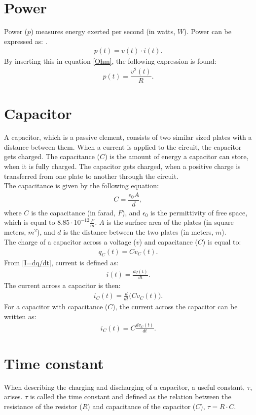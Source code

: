 \section{Power} 
Power ($p$) measures energy exerted per second (in watts, $W$). Power can be expressed as: \cite[p. 22]{bcircuit5}.
\begin{align} 
\label{power}
p(t)=v(t)\cdot i(t).
\end{align}
By inserting this in equation \eqref{Ohm}, the following expression is found:
\begin{align}
p(t)=\dfrac{v^2(t)}{R}. \label{resistor:power}
\end{align}

\section{Capacitor}
A capacitor, which is a passive element, consists of two similar sized plates with a distance between them. When a current is applied to the circuit, the capacitor gets charged. The capacitance ($C$) is the amount of energy a capacitor can store, when it is fully charged. The capacitor gets charged, when a positive charge is transferred from one plate to another through the circuit.
\\
The capacitance is given by the following equation:
\begin{align*}
C=\dfrac{\epsilon_{0}A}{d},
\end{align*}
where $C$ is the capacitance (in farad, $F$), and $\epsilon_{0}$ is the permittivity of free space, which is equal to $8.85 \cdot 10^{-12}                                                 \frac{F}{m}$. $A$ is the surface area of the plates (in square meters, $m^{2}$), and $d$ is the distance between the two plates (in meters, $m$).
\\
The charge of a capacitor across a voltage ($v$) and capacitance ($C$) is equal to: \cite[p.~253]{bcircuit5}
\begin{align}
\label{QCV}
q_C(t) = Cv_C(t).	
\end{align}
From \eqref{I=dq/dt}, current is defined as:
\begin{align*}
	i(t) = \frac{dq(t)}{dt}.
\end{align*}
The current across a capacitor is then:
\begin{align*}
	i_C(t) = \frac{d}{dt}\big(Cv_C(t)\big).
\end{align*}
For a capacitor with capacitance ($C$), the current across the capacitor can be written as:
\begin{align}
	i_C(t) = C\frac{dv_C(t)}{dt}.\label{iC}
\end{align}
\section{Time constant}
When describing the charging and discharging of a capacitor, a useful constant, $\tau$, arises. $\tau$ is called the time constant and defined as the relation between the resistance of the resistor ($R$) and capacitance of the capacitor ($C$), $\tau = R \cdot C$.